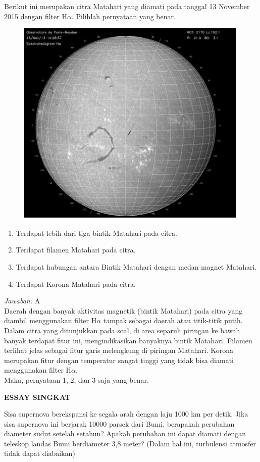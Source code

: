 \documentclass[11pt,fleqn]{exam}
\begin{document}
\begin{questions}
\question Berikut ini merupakan citra Matahari yang diamati pada tanggal 13 November 2015 dengan filter H$\alpha$. Pilihlah pernyataan yang benar.
\begin{figure}[h!]
\centering
\includegraphics[scale=0.7]{matahari.png}
\end{figure}
\begin{enumerate}
\item Terdapat lebih dari tiga bintik Matahari pada citra.
\item Terdapat filamen Matahari pada citra.
\item Terdapat hubungan antara Bintik Matahari dengan medan magnet Matahari.
\item Terdapat Korona Matahari pada citra.
\end{enumerate}

\textit{Jawaban: } A\\
Daerah dengan banyak aktivitas magnetik (bintik Matahari) pada citra yang diambil menggunakan filter H$\alpha$ tampak sebagai daerah atau titik-titik putih. Dalam citra yang ditunjukkan pada soal, di area separuh piringan ke bawah banyak terdapat fitur ini, mengindikasikan banyaknya bintik Matahari. Filamen terlihat jelas sebagai fitur garis melengkung di piringan Matahari. Korona merupakan fitur dengan temperatur sangat tinggi yang tidak bisa diamati menggunakan filter H$\alpha$.\\
Maka, pernyataan 1, 2, dan 3 saja yang benar.

\newpage
\textbf{ESSAY SINGKAT}

\question Sisa supernova berekspansi ke segala arah dengan laju 1000 km per detik. Jika sisa supernova ini berjarak 10000 parsek dari Bumi, berapakah perubahan diameter sudut setelah setahun? Apakah perubahan ini dapat diamati dengan teleskop landas Bumi berdiameter 3,8 meter? (Dalam hal ini, turbulensi atmosfer tidak dapat diabaikan)


\end{questions}
\end{document}
